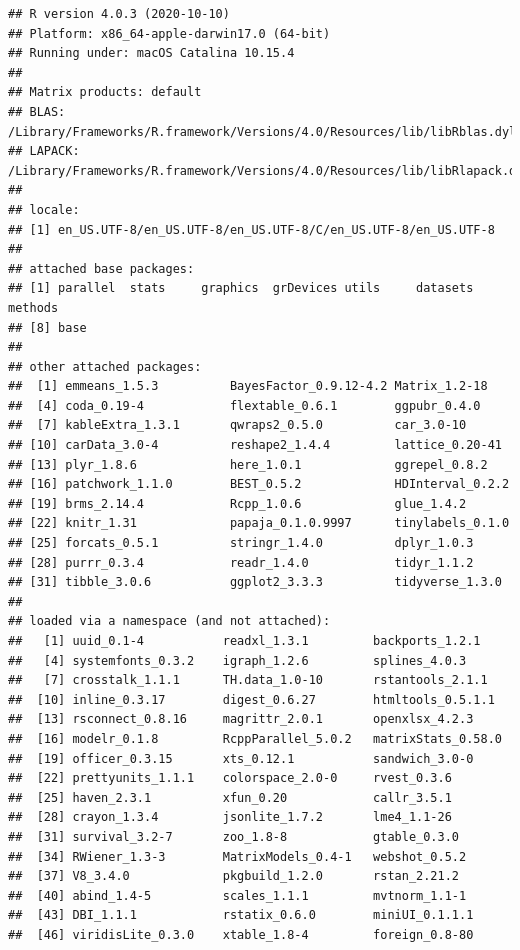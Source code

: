 \documentclass[
  11pt,
  english,
  ,doc,floatsintext]{apa6}
\begin{document}
\begin{verbatim}
## R version 4.0.3 (2020-10-10)
## Platform: x86_64-apple-darwin17.0 (64-bit)
## Running under: macOS Catalina 10.15.4
## 
## Matrix products: default
## BLAS:   /Library/Frameworks/R.framework/Versions/4.0/Resources/lib/libRblas.dylib
## LAPACK: /Library/Frameworks/R.framework/Versions/4.0/Resources/lib/libRlapack.dylib
## 
## locale:
## [1] en_US.UTF-8/en_US.UTF-8/en_US.UTF-8/C/en_US.UTF-8/en_US.UTF-8
## 
## attached base packages:
## [1] parallel  stats     graphics  grDevices utils     datasets  methods  
## [8] base     
## 
## other attached packages:
##  [1] emmeans_1.5.3          BayesFactor_0.9.12-4.2 Matrix_1.2-18         
##  [4] coda_0.19-4            flextable_0.6.1        ggpubr_0.4.0          
##  [7] kableExtra_1.3.1       qwraps2_0.5.0          car_3.0-10            
## [10] carData_3.0-4          reshape2_1.4.4         lattice_0.20-41       
## [13] plyr_1.8.6             here_1.0.1             ggrepel_0.8.2         
## [16] patchwork_1.1.0        BEST_0.5.2             HDInterval_0.2.2      
## [19] brms_2.14.4            Rcpp_1.0.6             glue_1.4.2            
## [22] knitr_1.31             papaja_0.1.0.9997      tinylabels_0.1.0      
## [25] forcats_0.5.1          stringr_1.4.0          dplyr_1.0.3           
## [28] purrr_0.3.4            readr_1.4.0            tidyr_1.1.2           
## [31] tibble_3.0.6           ggplot2_3.3.3          tidyverse_1.3.0       
## 
## loaded via a namespace (and not attached):
##   [1] uuid_0.1-4           readxl_1.3.1         backports_1.2.1     
##   [4] systemfonts_0.3.2    igraph_1.2.6         splines_4.0.3       
##   [7] crosstalk_1.1.1      TH.data_1.0-10       rstantools_2.1.1    
##  [10] inline_0.3.17        digest_0.6.27        htmltools_0.5.1.1   
##  [13] rsconnect_0.8.16     magrittr_2.0.1       openxlsx_4.2.3      
##  [16] modelr_0.1.8         RcppParallel_5.0.2   matrixStats_0.58.0  
##  [19] officer_0.3.15       xts_0.12.1           sandwich_3.0-0      
##  [22] prettyunits_1.1.1    colorspace_2.0-0     rvest_0.3.6         
##  [25] haven_2.3.1          xfun_0.20            callr_3.5.1         
##  [28] crayon_1.3.4         jsonlite_1.7.2       lme4_1.1-26         
##  [31] survival_3.2-7       zoo_1.8-8            gtable_0.3.0        
##  [34] RWiener_1.3-3        MatrixModels_0.4-1   webshot_0.5.2       
##  [37] V8_3.4.0             pkgbuild_1.2.0       rstan_2.21.2        
##  [40] abind_1.4-5          scales_1.1.1         mvtnorm_1.1-1       
##  [43] DBI_1.1.1            rstatix_0.6.0        miniUI_0.1.1.1      
##  [46] viridisLite_0.3.0    xtable_1.8-4         foreign_0.8-80      

\end{verbatim}
\end{document}
